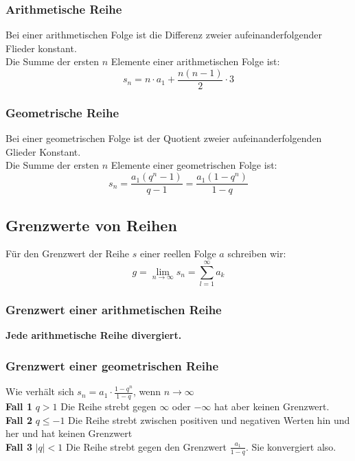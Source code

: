 \subsubsection{Arithmetische Reihe}
Bei einer arithmetischen Folge ist die Differenz zweier aufeinanderfolgender Flieder konstant. \\
Die Summe der ersten $n$ Elemente einer arithmetischen Folge ist:
\[
    s_n = n \cdot a_1 + \frac{n(n-1)}{2} \cdot 3
\]

\subsubsection{Geometrische Reihe}
Bei einer geometrischen Folge ist der Quotient zweier aufeinanderfolgenden Glieder Konstant. \\
Die Summe der ersten $n$ Elemente einer geometrischen Folge ist:
\[
    s_n = \frac{a_1(q^n-1)}{q-1} = \frac{a_1(1-q^n)}{1-q}
\]

\subsection{Grenzwerte von Reihen}
Für den Grenzwert der Reihe $s$ einer reellen Folge $a$ schreiben wir:
\[
    g=\lim_{n \to \infty} s_n = \sum_{l=1}^{\infty}a_k
\]

\subsubsection{Grenzwert einer arithmetischen Reihe}
\textbf{Jede arithmetische Reihe divergiert.}

\subsubsection{Grenzwert einer geometrischen Reihe}
Wie verhält sich $s_n = a_1 \cdot \frac{1-q^n}{1-q}$, wenn $n \to \infty$ \\
\textbf{Fall 1 } $q>1$ \hspace{5em} Die Reihe strebt gegen $\infty$ oder $-\infty$ hat aber keinen Grenzwert. \\
\textbf{Fall 2 } $q\leq -1$ \hspace{5em} Die Reihe strebt zwischen positiven und negativen Werten hin und her und hat keinen Grenzwert \\
\textbf{Fall 3 } $|q|<1$ \hspace{5em} Die Reihe strebt gegen den Grenzwert $\frac{a_1}{1-q}$. Sie konvergiert also.

